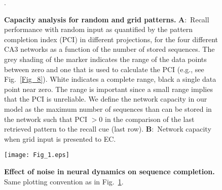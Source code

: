 \documentclass[utf8]{frontiersSCNS} %
\begin{document}
\begin{figure}[!htb]
\caption{\textbf{Capacity analysis for random and grid patterns.} 
\textbf{A}:~Recall performance with random input as quantified by the pattern completion index (PCI) in different projections, for the four different CA3 networks as a function of the number of stored sequences. The grey shading of the marker indicates the range of the data points between zero and one that is used to calculate the PCI (e.g., see Fig.~\ref{Fig_8}). White indicates a complete range, black a single data point near zero.
The range is important since a small range implies that the PCI is unreliable.
We define the network capacity in our model as the maximum number of sequences than can be stored in the network such that PCI $> 0$ in the comparison of the last retrieved pattern to the recall cue (last row). \textbf{B}:~Network capacity when grid input is presented to EC.}.   
\label{Fig_12}
\end{figure}


\begin{figure}[!htb]
\centering\texttt{[image: Fig\_1.eps]}
\caption{\textbf{Effect of noise in neural dynamics on sequence completion.}
Same plotting convention as in Fig.~\ref{Fig_12}.
 }
\label{Fig_13}
\end{figure}
\end{document}
